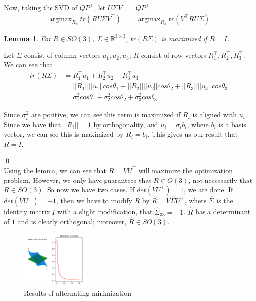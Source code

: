 \documentclass[a4paper]{article}
\DeclareMathOperator*{\argmax}{argmax}
\newtheorem{lemma}[theorem]{Lemma}
\begin{document}
Now, taking the SVD of $Q P^\intercal$, let $U \Sigma V^\intercal = Q P^\intercal$.
\begin{align*}
    \argmax_{R_k} tr(R U \Sigma V^\intercal) &= \argmax_{R_k} tr(V^\intercal R U \Sigma)
\end{align*}

\begin{lemma} For $R \in SO(3)$, $\Sigma \in \mathbb{R}^{3 \times 3}$, $tr(R \Sigma)$ is maximized if $R = I$.
\end{lemma}

Let $\Sigma$ consist of column vectors $u_1, u_2, u_3$, $R$ consist of row vectors $R_1^\intercal, R_2^\intercal, R_3^\intercal$. We can see that
\begin{align*}
    tr(R \Sigma) &= R_1^\intercal u_1 + R_2^\intercal u_2 + R_3^\intercal u_3 \\
    &= ||R_1||||u_1|| cos \theta_1 + ||R_2||||u_2|| cos \theta_2 + ||R_3||||u_3|| cos \theta_3 \\
    &= \sigma_1^2 cos \theta_1 + \sigma_2^2 cos \theta_2 + \sigma_3^2 cos \theta_3
\end{align*}

Since $\sigma_i^2$ are positive, we can see this term is maximized if $R_i$ is aligned with $u_i$. Since we have that $||R_i|| = 1$ by orthogonality, and $u_i = \sigma_i b_i$, where $b_i$ is a basis vector, we can see this is maximized by $R_i = b_i$. This gives us our result that $R = I$.

\qed \\

Using the lemma, we can see that $R = V U^\intercal$ will maximize the optimization problem. However, we only have guarantees that $R \in O(3)$, not necessarily that $R \in SO(3)$. So now we have two cases. If $det(V U^\intercal) = 1$, we are done. If $det(V U^\intercal) = -1$, then we have to modify $R$ by $\hat R = V \hat \Sigma U^\intercal$, where $\hat \Sigma$ is the identity matrix $I$ with a slight modification, that $\hat \Sigma_{33} = -1$. $\hat R$ has a determinant of $1$ and is clearly orthogonal; moreover, $\hat R \in SO(3)$. \\

\begin{figure}[!h]
\centering
\includegraphics[width=0.3\textwidth]{cs395t_graphics_hw2_alternating.png}
\caption{Results of alternating minimization}
\end{figure}
\end{document}
